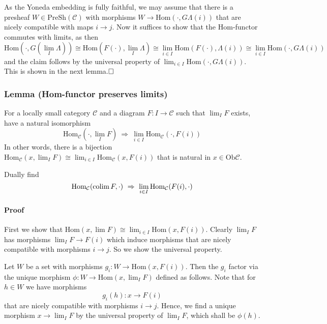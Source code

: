 As the Yoneda embedding is fully faithful, we may assume that there is a presheaf $W \in \mathrm{PreSh}(\mathcal{C})$ with morphisms $W \to \mathrm{Hom}(\cdot, G\Lambda(i))$ that are nicely compatible with maps $i \to j$.
Now it suffices to show that the Hom-functor commutes with limits, as then
\begin{equation*}
    \mathrm{Hom}(\cdot, G(\lim_I \Lambda)) \cong \mathrm{Hom}(F(\cdot), \lim_I \Lambda) \cong \lim_{i \in I} \mathrm{Hom}(F(\cdot), \Lambda(i)) \cong \lim_{i \in I} \mathrm{Hom}(\cdot, G\Lambda(i))
\end{equation*}
and the claim follows by the universal property of $\lim_{i \in I} \mathrm{Hom}(\cdot, G\Lambda(i))$.
This is shown in the next lemma.$\hfill\square$

\subsubsection{Lemma (Hom-functor preserves limits)}
For a locally small category $\mathcal{C}$ and a diagram $F: I \to \mathcal{C}$ such that $\lim_I F$ exists, have a natural isomorphism
\begin{equation*}
    \mathrm{Hom}_{\mathcal{C}}(\cdot, \lim_I F) \ \Rightarrow \ \lim_{i \in I} \mathrm{Hom}_{\mathcal{C}}(\cdot, F(i))
\end{equation*}
In other words, there is a bijection $\mathrm{Hom}_{\mathcal{C}}(x, \lim_I F) \cong \lim_{i \in I} \mathrm{Hom}_{\mathcal{C}}(x, F(i))$ that is natural in $x \in \mathrm{Ob}\mathcal{C}$.

Dually find
\begin{equation*}
    \mathrm{Hom}_{\mathcal{C}}(\colim F, \cdot) \ \Rightarrow \ \lim_{i \in I} \mathrm{Hom}_{\mathcal{C}}(F(i), \cdot)
\end{equation*}
\paragraph{Proof}
First we show that $\mathrm{Hom}(x, \lim F) \cong \lim_{i \in I} \mathrm{Hom}(x, F(i))$.
Clearly $\lim_I F$ has morphisms $\lim_I F \to F(i)$ which induce morphisms that are nicely compatible with morphisms $i \to j$. 
So we show the universal property.

Let $W$ be a set with morphisms $g_i: W \to \mathrm{Hom}(x, F(i))$. Then the $g_i$ factor via the unique morphism $\phi: W \to \mathrm{Hom}(x, \lim_I F)$ defined as follows.
Note that for $h \in W$ we have morphisms
\begin{equation*}
    g_i(h): x \to F(i)
\end{equation*}
that are nicely compatible with morphisms $i \to j$.
Hence, we find a unique morphism $x \to \lim_I F$ by the universal property of $\lim_I F$, which shall be $\phi(h)$.

